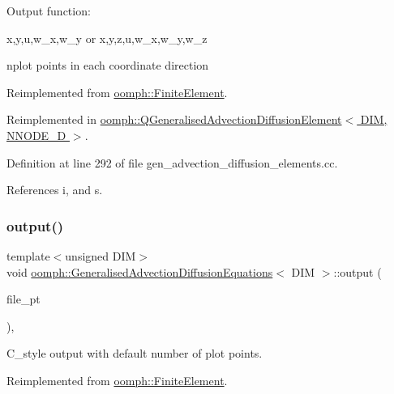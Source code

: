 Output function\+:

x,y,u,w\+\_\+x,w\+\_\+y or x,y,z,u,w\+\_\+x,w\+\_\+y,w\+\_\+z

nplot points in each coordinate direction 

Reimplemented from \hyperlink{classoomph_1_1FiniteElement_afa9d9b2670f999b43e6679c9dd28c457}{oomph\+::\+Finite\+Element}.



Reimplemented in \hyperlink{classoomph_1_1QGeneralisedAdvectionDiffusionElement_ae9327403058a327074ab0de659dc4609}{oomph\+::\+Q\+Generalised\+Advection\+Diffusion\+Element$<$ D\+I\+M, N\+N\+O\+D\+E\+\_\+D $>$}.



Definition at line 292 of file gen\+\_\+advection\+\_\+diffusion\+\_\+elements.\+cc.



References i, and s.

\mbox{\label{classoomph_1_1GeneralisedAdvectionDiffusionEquations_a299369dd1b578aa3634623c636440dde}} 
\subsubsection{\texorpdfstring{output()}{output()}\hspace{0.1cm}{\footnotesize\ttfamily [3/4]}}
{\footnotesize\ttfamily template$<$unsigned D\+IM$>$ \\
void \hyperlink{classoomph_1_1GeneralisedAdvectionDiffusionEquations}{oomph\+::\+Generalised\+Advection\+Diffusion\+Equations}$<$ D\+IM $>$\+::output (\begin{DoxyParamCaption}\item[{F\+I\+LE $\ast$}]{file\+\_\+pt }\end{DoxyParamCaption})\hspace{0.3cm}{\ttfamily [inline]}, {\ttfamily [virtual]}}



C\+\_\+style output with default number of plot points. 



Reimplemented from \hyperlink{classoomph_1_1FiniteElement_a72cddd09f8ddbee1a20a1ff404c6943e}{oomph\+::\+Finite\+Element}.



